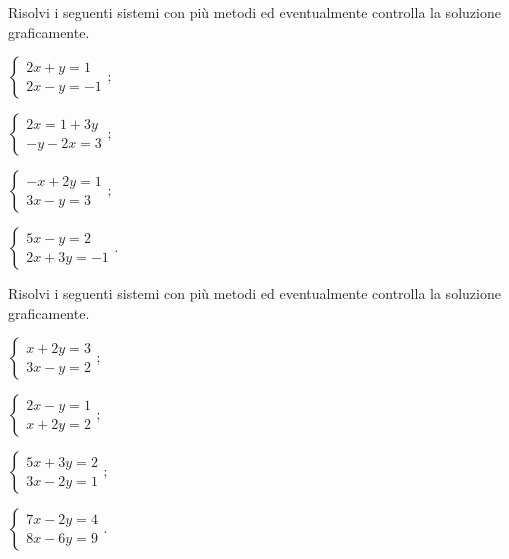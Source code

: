 \begin{esercizio}[\Ast]
 \label{ese:22.67}
 Risolvi i seguenti sistemi con più metodi ed eventualmente controlla
la soluzione graficamente.
\begin{multicols}{2}
\begin{enumeratea}
\item $\left\{\begin{array}{l}2x+y=1 \\2x-y=-1\end{array}\right.;$
\item $\left\{\begin{array}{l}2x=1+3y\\-y-2x=3\end{array}\right.;$
\item $\left\{\begin{array}{l}-x+2y=1 \\3x-y=3\end{array}\right.;$
\item $\left\{\begin{array}{l}5x-y=2\\2x+3y=-1 \end{array}\right..$
\end{enumeratea}
\end{multicols}
\end{esercizio}
\begin{esercizio}[\Ast]
 \label{ese:22.68}
 Risolvi i seguenti sistemi con più metodi ed eventualmente controlla
la soluzione graficamente.
\begin{multicols}{2}
\begin{enumeratea}
\item $\left\{\begin{array}{l}x+2y=3 \\3x-y=2\end{array}\right.;$
\item $\left\{\begin{array}{l}2x-y=1 \\x+2y=2\end{array}\right.;$
\item $\left\{\begin{array}{l}5x+3y=2 \\3x-2y=1\end{array}\right.;$
\item $\left\{\begin{array}{l}7x-2y=4\\8x-6y=9 \end{array}\right..$
\end{enumeratea}
\end{multicols}
\end{esercizio}

